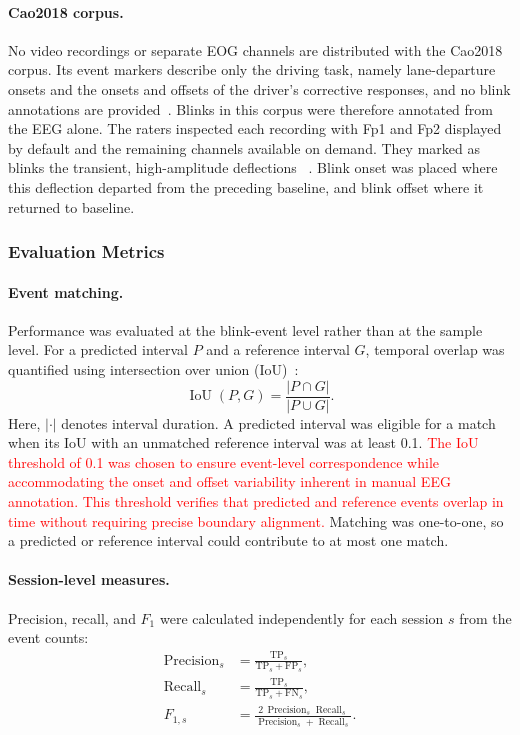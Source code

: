 \documentclass[journal,twoside,web]{ieeecolor}
\newcommand{\rev}[1]{\textcolor{red}{#1}}
\begin{document}
\paragraph{Cao2018 corpus.}
No video recordings or separate EOG channels are distributed with the Cao2018 corpus. Its event markers describe only the driving task, namely lane-departure onsets and the onsets and offsets of the driver's corrective responses, and no blink annotations are provided~\citep{cao2019multichannel}. Blinks in this corpus were therefore annotated from the EEG alone. The raters inspected each recording with Fp1 and Fp2 displayed by default and the remaining channels available on demand. They marked as blinks the transient, high-amplitude deflections ~\citep{iwasaki2005effects,croft2000removal,kleifges2017blinker}. Blink onset was placed where this deflection departed from the preceding baseline, and blink offset where it returned to baseline.
%
 
\subsubsection{Evaluation Metrics}
\label{sec:metrics}
%



\paragraph{Event matching.}
Performance was evaluated at the blink-event level rather than at the sample level. For a predicted interval $P$ and a reference interval $G$, temporal
overlap was quantified using intersection over union (IoU)~\cite{Startsev2023}:
\begin{equation}
    \operatorname{IoU}(P,G)
    = \frac{|P \cap G|}{|P \cup G|}.
\end{equation}
Here, $|\cdot|$ denotes interval duration.
A predicted interval was eligible for a match when its IoU with an unmatched reference interval was at least 0.1. \rev{The IoU threshold of 0.1 was chosen to ensure event-level correspondence while accommodating the onset and offset variability inherent in manual EEG annotation. This threshold verifies that predicted and reference events overlap in time without requiring precise boundary alignment.} Matching was one-to-one, so a predicted or reference interval could contribute to at most one match.

%

\paragraph{Session-level measures.}
Precision, recall, and $F_1$ were calculated independently for each session $s$ from the event counts:
\begin{align}
    \operatorname{Precision}_s
        &= \frac{\mathrm{TP}_s}{\mathrm{TP}_s+\mathrm{FP}_s}, \\
    \operatorname{Recall}_s
        &= \frac{\mathrm{TP}_s}{\mathrm{TP}_s+\mathrm{FN}_s}, \\
    F_{1,s}
        &= \frac{2\,\operatorname{Precision}_s\operatorname{Recall}_s}
        {\operatorname{Precision}_s+\operatorname{Recall}_s}.
\end{align}
\end{document}
